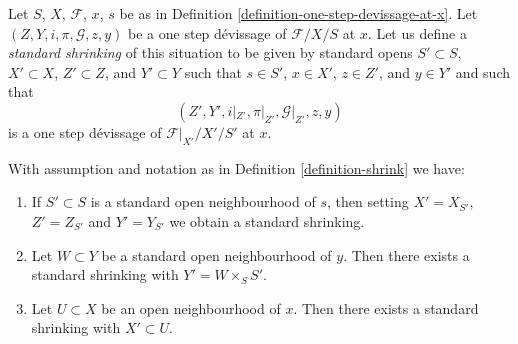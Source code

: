 \begin{definition}
\label{definition-shrink}
Let $S$, $X$, $\mathcal{F}$, $x$, $s$ be as in
Definition \ref{definition-one-step-devissage-at-x}.
Let $(Z, Y, i, \pi, \mathcal{G}, z, y)$ be a one step d\'evissage
of $\mathcal{F}/X/S$ at $x$. Let us define a
{\it standard shrinking} of this situation to be
given by standard opens $S' \subset S$, $X' \subset X$, $Z' \subset Z$,
and $Y' \subset Y$ such that $s \in S'$, $x \in X'$, $z \in Z'$, and
$y \in Y'$ and such that
$$
(Z', Y', i|_{Z'}, \pi|_{Z'}, \mathcal{G}|_{Z'}, z, y)
$$
is a one step d\'evissage of $\mathcal{F}|_{X'}/X'/S'$ at $x$.
\end{definition}

\begin{lemma}
\label{lemma-shrink}
With assumption and notation as in
Definition \ref{definition-shrink}
we have:
\begin{enumerate}
\item
\label{item-shrink-base}
If $S' \subset S$ is a standard open neighbourhood of $s$, then
setting $X' = X_{S'}$, $Z' = Z_{S'}$ and $Y' = Y_{S'}$ we obtain a
standard shrinking.
\item
\label{item-shrink-on-Y}
Let $W \subset Y$ be a standard open neighbourhood of $y$.
Then there exists a standard shrinking with $Y' = W \times_S S'$.
\item
\label{item-shrink-on-X}
Let $U \subset X$ be an open neighbourhood of $x$.
Then there exists a standard shrinking with $X' \subset U$.
\end{enumerate}
\end{lemma}

